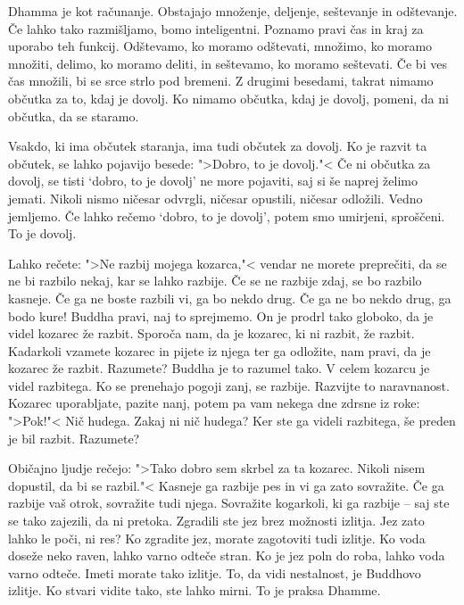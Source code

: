 \clearpage


Dhamma je kot računanje. Obstajajo množenje, deljenje, seštevanje in odštevanje. Če lahko tako razmišljamo, bomo inteligentni. Poznamo pravi čas in kraj za uporabo teh funkcij. Odštevamo, ko moramo odštevati, množimo, ko moramo množiti, delimo, ko moramo deliti, in seštevamo, ko moramo seštevati. Če bi ves čas množili, bi se srce strlo pod bremeni. Z drugimi besedami, takrat nimamo občutka za to, kdaj je dovolj. Ko nimamo občutka, kdaj je dovolj, pomeni, da ni občutka, da se staramo. 

Vsakdo, ki ima občutek staranja, ima tudi občutek za dovolj. Ko je razvit ta občutek, se lahko pojavijo besede: ">Dobro, to je dovolj."< Če ni občutka za dovolj, se tisti `dobro, to je dovolj' ne more pojaviti, saj si še naprej želimo jemati. Nikoli nismo ničesar odvrgli, ničesar opustili, ničesar odložili. Vedno jemljemo. Če lahko rečemo `dobro, to je dovolj', potem smo umirjeni, sproščeni. To je dovolj.

\clearpage


Lahko rečete: ">Ne razbij mojega kozarca,"< vendar ne morete preprečiti, da se ne bi razbilo nekaj, kar se lahko razbije. Če se ne razbije zdaj, se bo razbilo kasneje. Če ga ne boste razbili vi, ga bo nekdo drug. Če ga ne bo nekdo drug, ga bodo kure! Buddha pravi, naj to sprejmemo. On je prodrl tako globoko, da je videl kozarec že razbit. Sporoča nam, da je kozarec, ki ni razbit, že razbit. Kadarkoli vzamete kozarec in pijete iz njega ter ga odložite, nam pravi, da je kozarec že razbit. Razumete? Buddha je to razumel tako. V celem kozarcu je videl razbitega. Ko se prenehajo pogoji zanj, se razbije. Razvijte to naravnanost. Kozarec uporabljate, pazite nanj, potem pa vam nekega dne zdrsne iz roke: ">Pok!"< Nič hudega. Zakaj ni nič hudega? Ker ste ga videli razbitega, še preden je bil razbit. Razumete?

Običajno ljudje rečejo: ">Tako dobro sem skrbel za ta kozarec. Nikoli nisem dopustil, da bi se razbil."< Kasneje ga razbije pes in vi ga zato sovražite. Če ga razbije vaš otrok, sovražite tudi njega. Sovražite kogarkoli, ki ga razbije – saj ste se tako zajezili, da ni pretoka. Zgradili ste jez brez možnosti izlitja. Jez zato lahko le poči, ni res? Ko zgradite jez, morate zagotoviti tudi izlitje. Ko voda doseže neko raven, lahko varno odteče stran. Ko je jez poln do roba, lahko voda varno odteče. Imeti morate tako izlitje. To, da vidi nestalnost, je Buddhovo izlitje. Ko stvari vidite tako, ste lahko mirni. To je praksa Dhamme.

